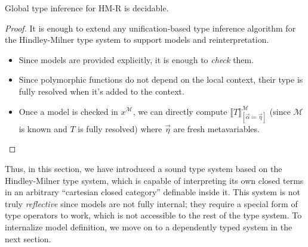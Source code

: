 \begin{theorem}
    Global type inference for HM-R is decidable.
\end{theorem}
\begin{proof}
    It is enough to extend any unification-based type
    inference algorithm for the Hindley-Milner type system
    to support models and reinterpretation.
    \begin{itemize}
        \item Since models are provided explicitly, it
            is enough to \textit{check} them.
        \item Since polymorphic functions do not depend
            on the local context, their type is fully
            resolved when it's added to the context.
        \item Once a model is checked in $x^\mathcal{M}$,
            we can directly compute
            $\llbracket T\rrbracket^\mathcal{M}_{[
                \vec{\alpha}\coloneqq\vec{\eta}]}$
            (since $\mathcal{M}$ is known and $T$ is
            fully resolved) where $\vec{\eta}$ are
            fresh metavariables.
    \end{itemize}
\end{proof}

Thus, in this section, we have introduced a sound type system
based on the Hindley-Milner type system, which is capable of
interpreting its own closed terms in an arbitrary
``cartesian closed category'' definable inside it. This
system is not truly \textit{reflective} since models are
not fully internal; they require a special form of type
operators to work, which is not accessible to the rest of
the type system. To internalize model definition, we move on
to a dependently typed system in the next section.
